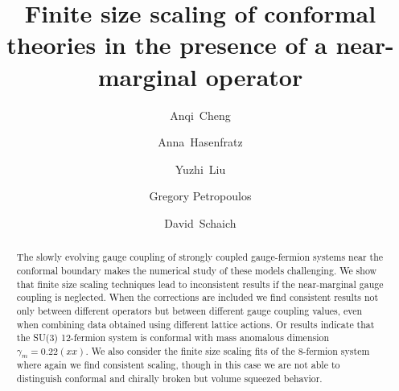 \documentclass[aps,prl,twocolumn,]{revtex4}  %
\begin{document}
\title{Finite size scaling of conformal theories in the presence of a near-marginal operator}


\author{Anqi~Cheng}
\author{Anna~Hasenfratz}
\author{Yuzhi~Liu}
\author{Gregory Petropoulos}
\author{David~Schaich}

\begin{abstract}
The slowly evolving gauge coupling of strongly coupled gauge-fermion systems near the conformal boundary makes the numerical study of these models challenging. We show that finite size scaling techniques lead to inconsistent results if the near-marginal gauge coupling is neglected. When the corrections are included we find consistent results not only between different operators but between different gauge coupling values, even when combining data obtained using different lattice actions. Or results indicate that the SU(3) 12-fermion system is conformal with mass anomalous dimension $\gamma_m=0.22(xx)$. We also consider the finite size scaling fits of the 8-fermion system where  again we find consistent scaling, though in this case we are not able to distinguish conformal and chirally broken but volume squeezed behavior.
\end{abstract}

\maketitle






\end{document}
